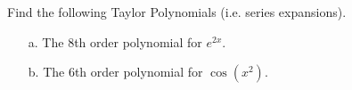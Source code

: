 {Find the following Taylor Polynomials (i.e. series expansions).
\begin{enumerate}
\item[a.] The 8th order polynomial for $e^{2x}$.
\item[b.] The 6th order polynomial for $\cos(x^2)$. 
\end{enumerate}}
{}
